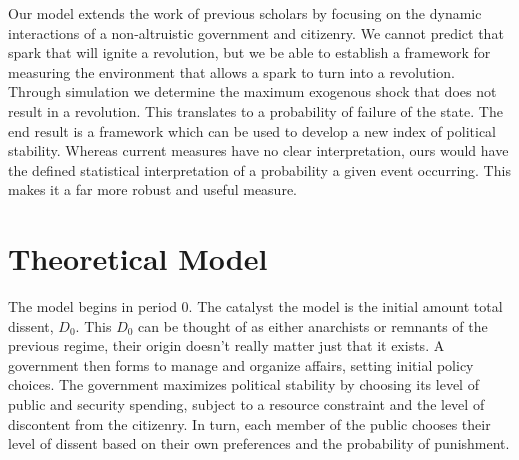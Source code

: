 \documentclass[12pt]{article}
\begin{document}
\begin{spacing}{1.5}
Our model extends the work of previous scholars by focusing on the dynamic interactions of a non-altruistic government and citizenry. We cannot predict that spark that will ignite a revolution, but we be able to establish a framework for measuring the environment that allows a spark to turn into a revolution. Through simulation we determine the maximum exogenous shock that does not result in a revolution. This translates to a probability of failure of the state. The end result is a framework which can be used to develop a new index of political stability. Whereas current measures have no clear interpretation, ours would have the defined statistical interpretation of a probability a given event occurring. This makes it a far more robust and useful measure.    

\section{Theoretical Model}










The model begins in period 0. The catalyst the model is the initial amount total dissent, $D_0$. This $D_0$ can be thought of as either anarchists or remnants of the previous regime, their origin doesn't really matter just that it exists. A government then forms to manage and organize affairs, setting initial policy choices. The government maximizes political stability by choosing its level of public and security spending, subject to a resource constraint and the level of discontent from the citizenry. In turn, each member of the public chooses their level of dissent based on their own preferences and the probability of punishment.
 

\end{spacing}
\end{document}

